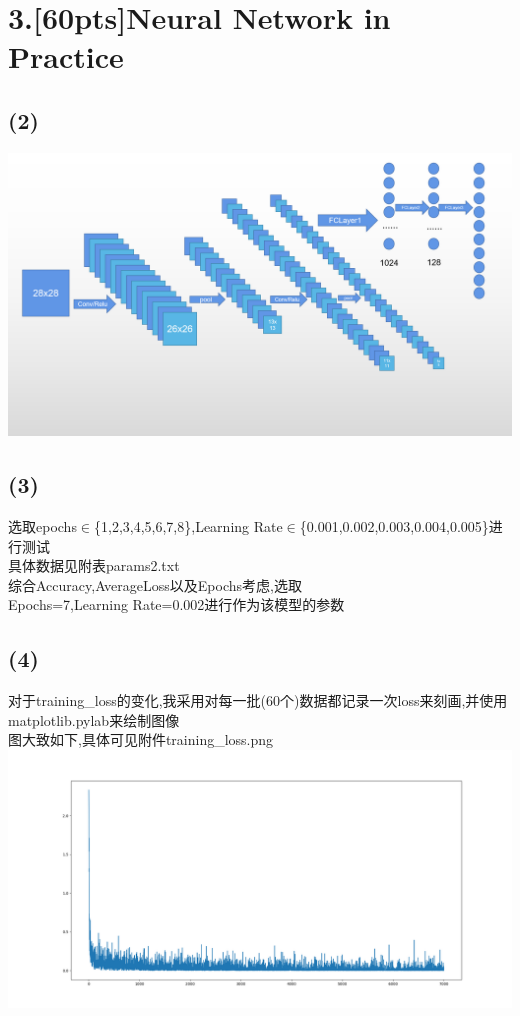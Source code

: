 \documentclass{article}
\begin{document}
\section*{3.[60pts]Neural Network in Practice}\noindent
\subsection*{(2)}\noindent
\includegraphics[scale=0.23]{Lenet.png}
\subsection*{(3)}\noindent
选取epochs$\in$\{1,2,3,4,5,6,7,8\},Learning Rate$\in$\{0.001,0.002,0.003,0.004,0.005\}进行测试\\
具体数据见附表params2.txt\\
综合Accuracy,AverageLoss以及Epochs考虑,选取\\
Epochs=7,Learning Rate=0.002进行作为该模型的参数
\subsection*{(4)}\noindent
对于training\_loss的变化,我采用对每一批(60个)数据都记录一次loss来刻画,并使用\\matplotlib.pylab来绘制图像\\
图大致如下,具体可见附件training\_loss.png\\
\includegraphics*[scale=0.33]{training_loss.png}
\end{document}
